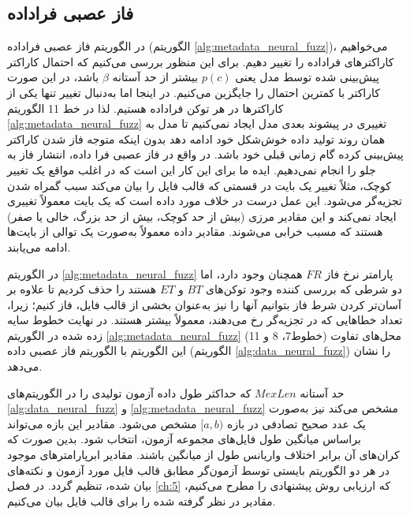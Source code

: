  
 
\subsection{فاز عصبی فراداده}
در الگوریتم فاز عصبی فراداده (الگوریتم \ref{alg:metadata_neural_fuzz})، می‌خواهیم کاراکترهای فراداده را تغییر دهیم. برای این منظور بررسی می‌کنیم که احتمال کاراکتر پیش‌بینی شده توسط مدل یعنی $p(c)$ بیشتر از حد آستانه 
$\beta$
باشد، در این صورت کاراکتر با کمترین احتمال را جایگزین می‌کنیم. در اینجا اما به‌دنبال تغییر تنها یکی از کاراکترها در هر توکن فراداده هستیم. لذا در خط 11 الگوریتم \ref{alg:metadata_neural_fuzz} تغییری در پیشوند بعدی مدل ایجاد نمی‌کنیم تا مدل به همان روند تولید داده خوش‌شکل خود ادامه دهد بدون اینکه متوجه فاز شدن کاراکتر پیش‌بینی کرده گام زمانی قبلی خود باشد. در واقع در فاز عصبی فرا داده، انتشار فاز به جلو را انجام نمی‌دهیم. ایده ما برای این کار این است که در اغلب مواقع یک تغییر کوچک، مثلاً تغییر یک بایت در قسمتی که قالب فایل را بیان می‌کند سبب گمراه شدن تجزیه‌گر می‌شود. این عمل درست در خلاف مورد داده است که یک بایت معمولاً تغییری ایجاد نمی‌کند و این مقادیر مرزی (بیش از حد کوچک، بیش از حد بزرگ، خالی یا صفر) هستند که مسبب خرابی می‌شوند. مقادیر داده معمولاً به‌صورت یک توالی از بایت‌ها ادامه می‌یابند. 


در الگوریتم \ref{alg:metadata_neural_fuzz} پارامتر نرخ فاز $FR$ همچنان وجود دارد، اما دو شرطی که بررسی کننده وجود توکن‌های $BT$ و $ET$ هستند را حذف کردیم تا علاوه بر آسان‌تر کردن شرط فاز بتوانیم آنها را نیز به‌عنوان بخشی از قالب فایل، فاز کنیم؛ زیرا، تعداد خطاهایی که در تجزیه‌گر رخ می‌دهند، معمولاً بیشتر هستند.
در نهایت خطوط سایه زده شده در الگوریتم \ref{alg:metadata_neural_fuzz} (خطوط7، 8 و 11) محل‌های تفاوت این الگوریتم با الگوریتم فاز عصبی داده (الگوریتم \ref{alg:data_neural_fuzz}) را نشان می‌دهد.
 
 حد آستانه $MexLen$ که حداکثر طول داده آزمون تولیدی را در الگوریتم‌های \ref{alg:data_neural_fuzz} و \ref{alg:metadata_neural_fuzz} مشخص می‌کند نیز به‌صورت یک عدد صحیح تصادفی در بازه $[a,b)$ مشخص می‌شود. مقادیر این بازه می‌تواند براساس میانگین طول فایل‌های مجموعه آزمون، انتخاب شود. بدین صورت که کران‌های آن برابر اختلاف واریانس طول از میانگین باشند. مقادیر ابرپارامترهای موجود در هر دو الگوریتم بایستی توسط آزمون‌گر مطابق قالب فایل مورد آزمون و نکته‌های بیان‌ شده، تنظیم گردد. در فصل 
 \ref{ch:5}
 که ارزیابی روش پیشنهادی را مطرح می‌کنیم، مقادیر در نظر گرفته شده را برای قالب فایل 
 بیان می‌کنیم.
 

